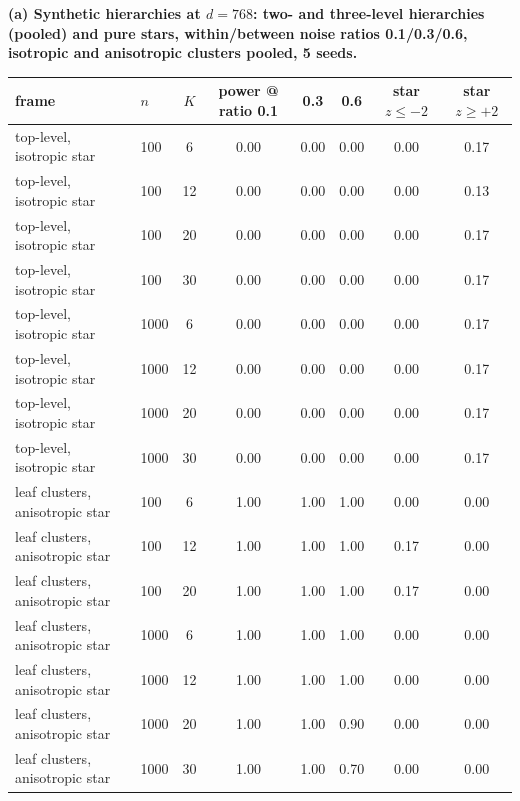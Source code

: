 \begin{table}[tbp]
\centering
\scriptsize
\setlength{\tabcolsep}{2pt}
\begingroup
\noindent\textbf{(a) Synthetic hierarchies at $d{=}768$: two- and three-level hierarchies (pooled) and pure stars, within/between noise ratios 0.1/0.3/0.6, isotropic and anisotropic clusters pooled, 5 seeds.}\par\vspace{1.5pt}
\footnotesize
\setlength{\tabcolsep}{4pt}
\begin{tabular}{llcccccc}
\toprule
frame & $n$ & $K$ & power @ ratio 0.1 & 0.3 & 0.6 & star $z\le-2$ & star $z\ge+2$ \\
\midrule
top-level, isotropic star & 100 & 6 & 0.00 & 0.00 & 0.00 & 0.00 & 0.17 \\
top-level, isotropic star & 100 & 12 & 0.00 & 0.00 & 0.00 & 0.00 & 0.13 \\
top-level, isotropic star & 100 & 20 & 0.00 & 0.00 & 0.00 & 0.00 & 0.17 \\
top-level, isotropic star & 100 & 30 & 0.00 & 0.00 & 0.00 & 0.00 & 0.17 \\
top-level, isotropic star & 1000 & 6 & 0.00 & 0.00 & 0.00 & 0.00 & 0.17 \\
top-level, isotropic star & 1000 & 12 & 0.00 & 0.00 & 0.00 & 0.00 & 0.17 \\
top-level, isotropic star & 1000 & 20 & 0.00 & 0.00 & 0.00 & 0.00 & 0.17 \\
top-level, isotropic star & 1000 & 30 & 0.00 & 0.00 & 0.00 & 0.00 & 0.17 \\
\midrule
leaf clusters, anisotropic star & 100 & 6 & 1.00 & 1.00 & 1.00 & 0.00 & 0.00 \\
leaf clusters, anisotropic star & 100 & 12 & 1.00 & 1.00 & 1.00 & 0.17 & 0.00 \\
leaf clusters, anisotropic star & 100 & 20 & 1.00 & 1.00 & 1.00 & 0.17 & 0.00 \\
leaf clusters, anisotropic star & 1000 & 6 & 1.00 & 1.00 & 1.00 & 0.00 & 0.00 \\
leaf clusters, anisotropic star & 1000 & 12 & 1.00 & 1.00 & 1.00 & 0.00 & 0.00 \\
leaf clusters, anisotropic star & 1000 & 20 & 1.00 & 1.00 & 0.90 & 0.00 & 0.00 \\
leaf clusters, anisotropic star & 1000 & 30 & 1.00 & 1.00 & 0.70 & 0.00 & 0.00 \\

\end{tabular}
\end{table}
